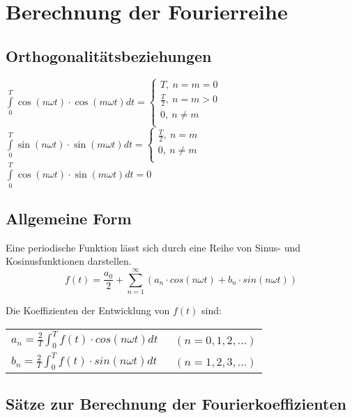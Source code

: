 \section{Berechnung der Fourierreihe}
\subsection{Orthogonalitätsbeziehungen}

            $\int\limits_0^T \cos(n\omega t)\cdot \cos(m\omega t)dt=
            \begin{cases}
            T,\ n=m=0\\
            \frac{T}{2},\ n=m>0\\ 
            0,\ n\neq m\\
            \end{cases}$\\
            
            
           $\int\limits_0^T \sin(n\omega t)\cdot \sin(m\omega t)dt=
           \begin{cases}
           \frac{T}{2},\ n=m\\
           0,\ n\neq m\\
           \end{cases}$\\
           $\int\limits_0^T \cos(n\omega t)\cdot \sin(m\omega t)dt=0$
           
\subsection{Allgemeine Form}
Eine periodische Funktion lässt sich durch eine Reihe von Sinus- und Kosinusfunktionen darstellen.
$$f(t) = \frac{a_{0}}{2}+\sum_{n = 1}^{\infty} (a_{n} \cdot cos(n \omega t)+ b_{n} \cdot sin(n \omega t))$$

Die Koeffizienten der Entwicklung von $f(t)$ sind:\\
\begin{tabular}{ll}
  $a_{n} = \frac{2}{T}\int_{0}^{T}f(t) \cdot cos(n \omega t)dt$   &\ $(n = 0,1,2,...)$\\
  $b_{n} = \frac{2}{T}\int_{0}^{T}f(t) \cdot sin(n \omega t)dt$   &\ $(n = 1,2,3,...)$\\
\end{tabular}
\subsection{Sätze zur Berechnung der Fourierkoeffizienten}
